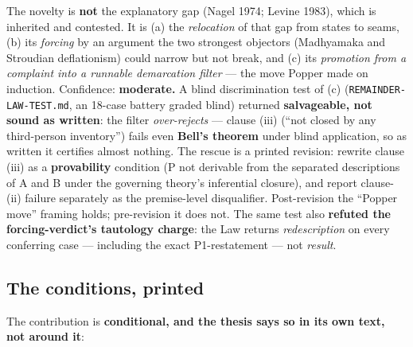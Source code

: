 \documentclass[11pt]{article}
\begin{document}
The novelty is \textbf{not} the explanatory gap (Nagel 1974; Levine 1983), which is inherited and contested. It is (a) the \emph{relocation} of that gap from states to seams, (b) its \emph{forcing} by an argument the two strongest objectors (Madhyamaka and Stroudian deflationism) could narrow but not break, and (c) its \emph{promotion from a complaint into a runnable demarcation filter} — the move Popper made on induction. Confidence: \textbf{moderate.} A blind discrimination test of (c) (\texttt{REMAINDER-LAW-TEST.md}, an 18-case battery graded blind) returned \textbf{salvageable, not sound as written}: the filter \emph{over-rejects} — clause (iii) (``not closed by any third-person inventory'') fails even \textbf{Bell's theorem} under blind application, so as written it certifies almost nothing. The rescue is a printed revision: rewrite clause (iii) as a \textbf{provability} condition (P not derivable from the separated descriptions of A and B under the governing theory's inferential closure), and report clause-(ii) failure separately as the premise-level disqualifier. Post-revision the ``Popper move'' framing holds; pre-revision it does not. The same test also \textbf{refuted the forcing-verdict's tautology charge}: the Law returns \emph{redescription} on every conferring case — including the exact P1-restatement — not \emph{result}.

\subsection*{The conditions, printed}

The contribution is \textbf{conditional, and the thesis says so in its own text, not around it}:
\end{document}
